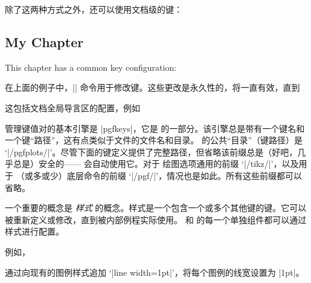 除了这两种方式之外，还可以使用文档级的键：
%
\begin{codeexample}
\chapter{My Chapter}
\pgfplotsset{
    key=value,
    key2=value2,
}
This chapter has a common key configuration:
\end{codeexample}
%
\noindent 在上面的例子中，|\pgfplotsset| 命令用于修改键。这些更改是永久性的，将一直有效，直到
%
\begin{itemize}
    \item 你重新定义它们，或者
    \item 当前环境（例如 |\end{figure}|）结束，或者
    \item \TeX{} 遇到闭花括号 `|}|'。
\end{itemize}
%
这包括文档全局导言区的配置，例如
%

管理键值对的基本引擎是 |pgfkeys|，它是 \pgfname{} 的一部分。该引擎总是带有一个键名和一个键“路径”，这有点类似于文件的文件名和目录。\PGFPlots{} 的公共“目录”（键路径）是 `|/pgfplots/|'。尽管下面的键定义提供了完整路径，但省略该前缀总是（好吧，几乎总是）安全的——\PGFPlots{} 会自动使用它。对于 \Tikz{} 绘图选项通用的前缀 `|/tikz/|'，以及用于 \pgfname{}（或多或少）底层命令的前缀 `|/pgf/|'，情况也是如此。所有这些前缀都可以省略。

一个重要的概念是 \emph{样式} 的概念。样式是一个包含一个或多个其他键的键。它可以被重新定义或修改，直到被内部例程实际使用。\Tikz{} 和 \PGFPlots{} 的每一个单独组件都可以通过样式进行配置。

例如，
%
\begin{codeexample}
\end{codeexample}
%
\noindent 通过向现有的图例样式追加 `|line width=1pt|'，将每个图例的线宽设置为 |1pt|。

